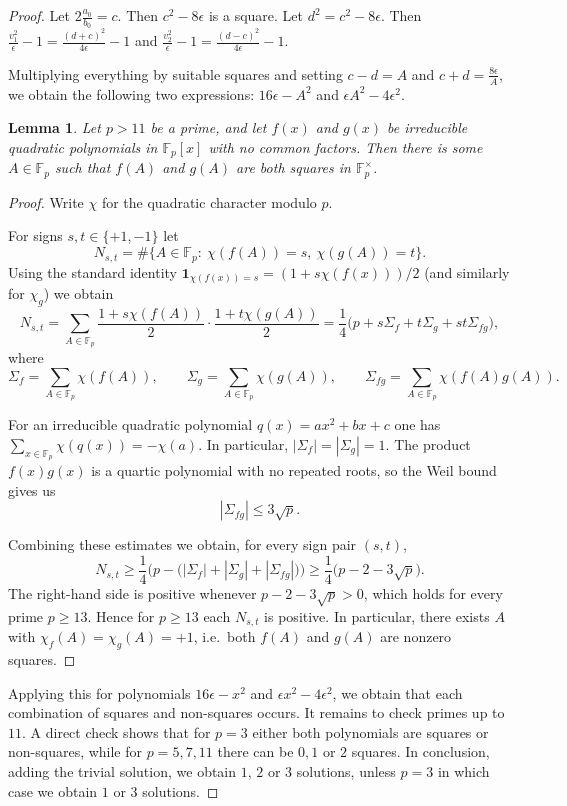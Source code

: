 \documentclass[10pt,a4paper]{amsart}
\newtheorem{lemma}{Lemma}
\newcommand{\F}{\mathbb{F}}
\begin{document}
\begin{proof}
Let $2\frac{a_0}{b_0}=c$. Then $c^2-8\epsilon$ is a square. Let $d^2=c^2-8\epsilon$. Then $\frac{v_1^2}{\epsilon}-1=\frac{(d+c)^2}{4\epsilon}-1$ and $\frac{v_2^2}{\epsilon}-1=\frac{(d-c)^2}{4\epsilon}-1.$

Multiplying everything by suitable squares and setting $c-d=A$ and $c+d=\frac{8\epsilon }{A}$, we obtain the following two expressions: $16\epsilon-A^2$ and $\epsilon A^2-4\epsilon^2$. 

\begin{lemma}
    Let $p>11$ be a prime, and let $f(x)$ and $g(x)$ be irreducible quadratic polynomials in $\F_p[x]$ with no common factors. Then there is some $A\in \F_p$ such that $f(A)$ and $g(A)$ are both squares in $\F_p^\times$.
\end{lemma}
\begin{proof}
Write \(\chi\) for the quadratic character modulo \(p\).

For signs \(s,t\in\{+1,-1\}\) let
\[
N_{s,t}=\#\{A\in\F_p:\ \chi(f(A))=s,\ \chi(g(A))=t\}.
\]
Using the standard identity \(\mathbf{1}_{\chi(f(x))=s}=(1+s\chi(f(x)))/2\) (and similarly for \(\chi_g\)) we obtain
\[
N_{s,t}=\sum_{A\in\F_p}\frac{1+s\chi(f(A))}{2}\cdot\frac{1+t\chi(g(A))}{2}
=\frac{1}{4}\Big(p+s\Sigma_f+t\Sigma_g+st\Sigma_{fg}\Big),
\]
where
\[
\Sigma_f=\sum_{A\in\F_p}\chi(f(A)),\qquad
\Sigma_g=\sum_{A\in\F_p}\chi(g(A)),\qquad
\Sigma_{fg}=\sum_{A\in\F_p}\chi(f(A)g(A)).
\]


For an irreducible quadratic polynomial \(q(x)=ax^2+bx+c\) one has \(\sum_{x\in\F_p}\chi(q(x))=-\chi(a).\) In particular, \(|\Sigma_f|=|\Sigma_g|=1\).  
The product \(f(x)g(x)\) is a quartic polynomial with no repeated roots, so the Weil bound gives us
\[
|\Sigma_{fg}|\leq  3\sqrt p.
\]

Combining these estimates we obtain, for every sign pair \((s,t)\),
\[
N_{s,t}\ge \frac{1}{4}\Big(p - \big(|\Sigma_f|+|\Sigma_g|+|\Sigma_{fg}|\big)\Big)
\ge \frac{1}{4}\big(p - 2 - 3\sqrt p\big).
\]
The right-hand side is positive whenever \(p-2-3\sqrt p>0\), which holds for every prime \(p\ge 13\). Hence for \(p\ge 13\) each \(N_{s,t}\) is positive. In particular, there exists \(A\) with \(\chi_f(A)=\chi_g(A)=+1\), i.e.\ both \(f(A)\) and \(g(A)\) are nonzero squares.
\end{proof}

Applying this for polynomials $16\epsilon-x^2$ and $\epsilon x^2-4\epsilon^2$, we obtain that each combination of squares and non-squares occurs. It remains to check primes up to $11$. A direct check shows that for $p=3$ either both polynomials are squares or non-squares, while for $p=5,7,11$ there can be $0,1$ or $2$ squares. In conclusion, adding the trivial solution, we obtain $1$, $2$ or $3$ solutions, unless $p=3$ in which case we obtain $1$ or $3$ solutions.



\end{proof}
\end{document}
